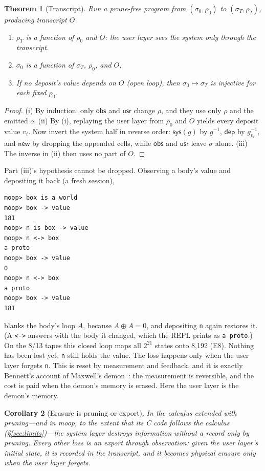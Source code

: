 \documentclass[11pt]{article}
\newtheorem{theorem}{Theorem}
\newtheorem{corollary}[theorem]{Corollary}
\theoremstyle{definition}
\theoremstyle{remark}
\newcommand{\moop}{\textsf{moop}}
\newcommand{\code}[1]{\texttt{#1}}
\newcommand{\xor}{\oplus}
\begin{document}
\begin{theorem}[Transcript]
\label{thm:transcript}
Run a prune-free program from $(\sigma_0,\rho_0)$ to
$(\sigma_T,\rho_T)$, producing transcript $O$.
\begin{enumerate}[nosep,label=(\roman*)]
\item $\rho_T$ is a function of $\rho_0$ and $O$: the user layer sees the
  system only through the transcript.
\item $\sigma_0$ is a function of $\sigma_T$, $\rho_0$, and $O$.
\item If no deposit's value depends on $O$ (open loop), then
  $\sigma_0\mapsto\sigma_T$ is injective for each fixed $\rho_0$.
\end{enumerate}
\end{theorem}
\begin{proof}
(i) By induction: only $\mathsf{obs}$ and $\mathsf{usr}$ change $\rho$,
and they use only $\rho$ and the emitted $o$. (ii) By (i), replaying the
user layer from $\rho_0$ and $O$ yields every deposit value $v_i$. Now
invert the system half in reverse order: $\mathsf{sys}(g)$ by $g^{-1}$,
$\mathsf{dep}$ by $g_{v_i}^{-1}$, and $\mathsf{new}$ by dropping the
appended cells, while $\mathsf{obs}$ and $\mathsf{usr}$ leave $\sigma$
alone. (iii) The inverse in (ii) then uses no part of $O$.
\end{proof}

Part (iii)'s hypothesis cannot be dropped. Observing a body's value and
depositing it back (a fresh session),
\begin{Verbatim}[fontsize=\small,xleftmargin=2em]
moop> box is a world
moop> box -> value
181
moop> n is box -> value
moop> n <-> box
a proto
moop> box -> value
0
moop> n <-> box
a proto
moop> box -> value
181
\end{Verbatim}
blanks the body's loop $A$, because $A\xor A=0$, and depositing
\code{n} again restores it. (A \code{<->} answers with the body it
changed, which the REPL prints as \code{a proto}.) On the 8/13 tapes this
closed loop maps all $2^{21}$ states onto 8,192 (E8). Nothing has been
lost yet: \code{n} still holds the value. The loss happens only when the
user layer forgets \code{n}. This is reset by measurement and feedback, and it is exactly
Bennett's account of Maxwell's demon~\cite{bennett1982}: the measurement
is reversible, and the cost is paid when the demon's memory is erased.
Here the user layer is the demon's memory.

\begin{corollary}[Erasure is pruning or export]
\label{cor:export}
In the calculus extended with pruning---and in \moop{}, to the extent
that its C code follows the calculus (\S\ref{sec:limits})---the system
layer destroys information without a record only by pruning. Every other
loss is an export through observation: given the user layer's initial
state, it is recorded in the transcript, and it becomes physical erasure
only when the user layer forgets.
\end{corollary}
\end{document}
